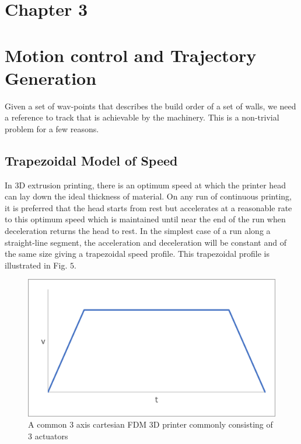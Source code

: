 \documentclass{UoNMCHA}
\numberwithin{equation}{section}
\begin{document}
	
	\newpage
	\section*{Chapter 3}
	\section{Motion control and Trajectory Generation}
	
	Given a set of wav-points that describes the build order of a set of walls, we need a reference to track
	that is achievable by the machinery. This is a non-trivial problem for a few reasons.
	\subsection{Trapezoidal Model of Speed}
	In $3 \mathrm{D}$ extrusion printing, there is an optimum speed at which the printer head can lay down the ideal
	thickness of material. On any run of continuous printing, it is preferred that the head starts from rest but
	accelerates at a reasonable rate to this optimum speed which is maintained until near the end of the run
	when deceleration returns the head to rest. In the simplest case of a run along a straight-line segment,
	the acceleration and deceleration will be constant and of the same size giving a trapezoidal speed profile.
	This trapezoidal profile is illustrated in Fig. $5 .$
	
	\begin{figure}[H]
		\begin{center}
			\includegraphics[width=.8\linewidth]{figs/Picture9}
			\caption{A  common 3 axis cartesian FDM 3D printer commonly consisting of 3 actuators}
			\label{figs/Picture9}
		\end{center}
	\end{figure}
	
\end{document}
